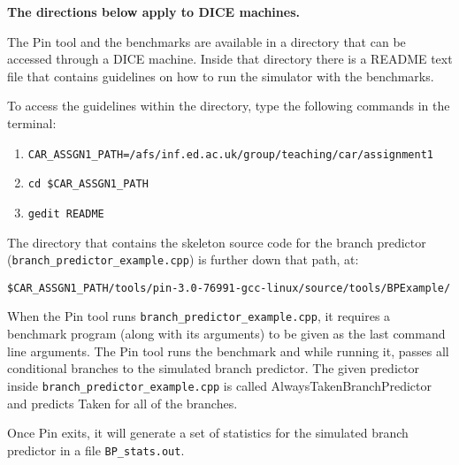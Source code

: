 \documentclass[a4paper,12pt]{article}
\theoremstyle{plain}
\begin{document}
\noindent \textbf{The directions below apply to DICE machines. }

The Pin tool and the benchmarks are available in a directory that can be accessed through a DICE machine. 
Inside that directory there is a README text file that contains guidelines on how to run the simulator with the benchmarks.

\noindent To access the guidelines within the directory, type the following commands in the terminal:
\begin{enumerate}
\item \texttt{CAR\_ASSGN1\_PATH=/afs/inf.ed.ac.uk/group/teaching/car/assignment1}
\item \texttt{cd \$CAR\_ASSGN1\_PATH} 
\item \texttt{gedit README}
\end{enumerate}

\noindent The directory that contains the skeleton source code for the branch predictor \\ (\texttt{branch\_predictor\_example.cpp}) is further down that path, at:

\vspace{0.05in}
 \texttt{\$CAR\_ASSGN1\_PATH/tools/pin-3.0-76991-gcc-linux/source/tools/BPExample/}

\vspace{0.05in}
\noindent When the Pin tool runs \texttt{branch\_predictor\_example.cpp}, it requires a benchmark program (along with its arguments) to be given as the last command line arguments. The Pin tool runs the benchmark and while running it, passes all conditional branches to the simulated branch predictor. The given predictor inside \texttt{branch\_predictor\_example.cpp} is called AlwaysTakenBranchPredictor and predicts Taken for all of the branches. 

Once Pin exits, it will generate a set of statistics for the simulated branch predictor in a file \texttt{BP\_stats.out}.
\end{document}
